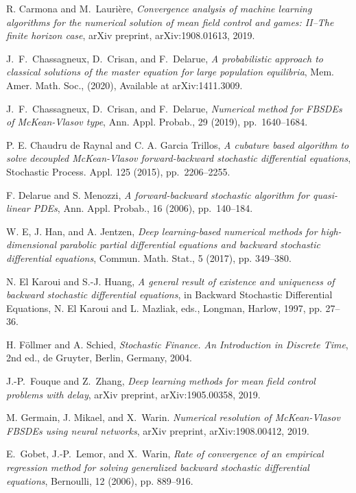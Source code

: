 \documentclass[11pt]{article}
\numberwithin{equation}{section}
\theoremstyle{definition}
\theoremstyle{remark}
\begin{document}
\begin{thebibliography}{1}
R. Carmona and M.~Lauri\`{e}re, 
\emph{Convergence analysis of machine learning algorithms for the numerical solution of mean field control and games: II--The finite horizon case},  arXiv preprint, arXiv:1908.01613, 2019.

J.~F.~Chassagneux, D.~Crisan, and F.~Delarue, 
\emph{A probabilistic approach to
classical solutions of the master equation for large population equilibria}, 
Mem. Amer. Math. Soc.,
(2020),
Available at
 arXiv:1411.3009.



J.~F.~Chassagneux, D.~Crisan, and F.~Delarue, 
\emph{Numerical method for FBSDEs of McKean-Vlasov type}, 
Ann. Appl. Probab., 29 (2019), pp.~1640--1684.

P. E. Chaudru de Raynal and C. A. Garcia Trillos, 
\emph{A cubature based algorithm to solve decoupled McKean-Vlasov forward-backward stochastic differential equations}, Stochastic Process. Appl. 125 (2015), pp.~2206--2255.

F. Delarue and S. Menozzi, \emph{A forward-backward stochastic algorithm for quasi-linear PDEs},
Ann. Appl. Probab., 16 (2006), pp.~140--184.

W. E, J. Han, and A. Jentzen, \emph{Deep learning-based numerical methods for high-dimensional parabolic partial differential equations and backward stochastic differential equations}, Commun. Math. Stat., 5 (2017), pp. 349--380.


N. El Karoui and S.-J. Huang, \emph{A general result of existence and uniqueness of backward
stochastic differential equations}, in Backward Stochastic Differential Equations, N. El
Karoui and L. Mazliak, eds., Longman, Harlow, 1997, pp. 27--36.



H. F\"{o}llmer and A. Schied, \emph{Stochastic Finance. An Introduction in Discrete Time}, 2nd ed., de Gruyter,
Berlin, Germany, 2004.

J.-P.~Fouque and Z.~Zhang, \emph{Deep learning methods for mean field control problems with delay},
  arXiv preprint, arXiv:1905.00358, 2019.


M. Germain, J. Mikael, and X.~Warin. \emph{Numerical resolution of McKean-Vlasov
FBSDEs using neural networks},
  arXiv preprint, arXiv:1908.00412, 2019.


E.~Gobet, J.-P.~Lemor, and X.~Warin, \emph{Rate of convergence of an empirical regression method for
solving generalized backward stochastic differential equations}, Bernoulli, 12 (2006), pp. 889--916.




\end{thebibliography}
\end{document}
